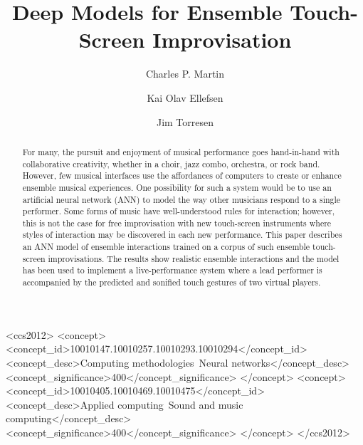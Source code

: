 \documentclass[sigchi]{acmart} %
\begin{document}

\title{Deep Models for Ensemble Touch-Screen Improvisation}

\author{Charles P. Martin}

\author{Kai Olav Ellefsen}

\author{Jim Torresen}

\begin{abstract}
  For many, the pursuit and enjoyment of musical performance goes
  hand-in-hand with collaborative creativity, whether in a choir, jazz
  combo, orchestra, or rock band. However, few musical interfaces use
  the affordances of computers to create or enhance ensemble musical
  experiences. One possibility for such a system would be to use an
  artificial neural network (ANN) to model the way other musicians
  respond to a single performer. Some forms of music have
  well-understood rules for interaction; however, this is not the case
  for free improvisation with new touch-screen instruments where
  styles of interaction may be discovered in each new performance.
  This paper describes an ANN model of ensemble interactions trained
  on a corpus of such ensemble touch-screen improvisations. The
  results show realistic ensemble interactions and the model has been
  used to implement a live-performance system where a lead performer
  is accompanied by the predicted and sonified touch gestures of two virtual players.
\end{abstract}

\begin{CCSXML}
<ccs2012>
<concept>
<concept_id>10010147.10010257.10010293.10010294</concept_id>
<concept_desc>Computing methodologies~Neural networks</concept_desc>
<concept_significance>400</concept_significance>
</concept>
<concept>
<concept_id>10010405.10010469.10010475</concept_id>
<concept_desc>Applied computing~Sound and music computing</concept_desc>
<concept_significance>400</concept_significance>
</concept>
</ccs2012>
\end{CCSXML}
\end{document}
